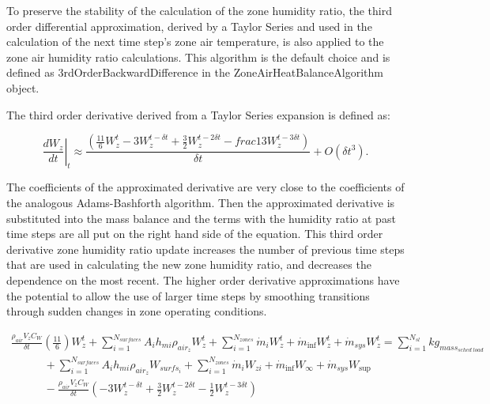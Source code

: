 To preserve the stability of the calculation of the zone humidity ratio, the third order differential approximation, derived by a Taylor Series and used in the calculation of the next time step's zone air temperature, is also applied to the zone air humidity ratio calculations. This algorithm is the default choice and is defined as 3rdOrderBackwardDifference in the ZoneAirHeatBalanceAlgorithm object.

The third order derivative derived from a Taylor Series expansion is defined as:

\begin{equation}
{\left. {\frac{{d{W_z}}}{{dt}}} \right|_t} \approx \frac{{\left( {{\textstyle{\frac{11}{6}}}W_z^t - 3W_z^{t - \delta t} + {\textstyle{\frac{3}{2}}}W_z^{t - 2\delta t} - {\textstyle{frac{1}{3}}}W_z^{t - 3\delta t}} \right)}}{{\delta t}} + O\left( {\delta {t^3}} \right) .
\end{equation}

The coefficients of the approximated derivative are very close to the coefficients of the analogous Adams-Bashforth algorithm. Then the approximated derivative is substituted into the mass balance and the terms with the humidity ratio at past time steps are all put on the right hand side of the equation. This third order derivative zone humidity ratio update increases the number of previous time steps that are used in calculating the new zone humidity ratio, and decreases the dependence on the most recent. The higher order derivative approximations have the potential to allow the use of larger time steps by smoothing transitions through sudden changes in zone operating conditions.

\begin{equation}
\begin{array}{l}\frac{{{\rho_{air}}{V_z}{C_W}}}{{\delta t}}\left( {\frac{{11}}{6}} \right)W_z^t + \sum\limits_{i = 1}^{{N_{surfaces}}} {{A_i}{h_{mi}}} {\rho_{ai{r_z}}}W_z^t + \sum\limits_{i = 1}^{{N_{zones}}} {{{\dot m}_i}} W_z^t + {{\dot m}_{\inf }}W_z^t + {{\dot m}_{sys}}W_z^t = \sum\limits_{i = 1}^{{N_{sl}}} {k{g_{mas{s_{sched\;load}}}}} \\
\quad \quad \quad + \sum\limits_{i = 1}^{{N_{surfaces}}} {{A_i}{h_{mi}}} {\rho_{ai{r_z}}}{W_{surf{s_i}}} + \sum\limits_{i = 1}^{{N_{zones}}} {{{\dot m}_i}} {W_{zi}} + {{\dot m}_{\inf }}{W_\infty } + {{\dot m}_{sys}}{W_{\sup }} \\
\quad \quad \quad - \frac{{{\rho_{air}}{V_z}{C_W}}}{{\delta t}}\left( { - 3W_z^{t - \delta t} + \frac{3}{2}W_z^{t - 2\delta t} - \frac{1}{2}W_z^{t - 3\delta t}} \right)\end{array}
\end{equation}

